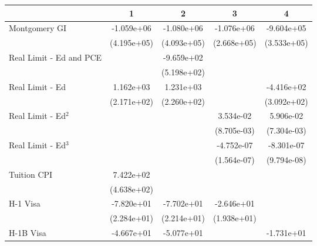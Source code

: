 
\begin{tabular}{l*{4}{c}}
    \toprule
                             &\multicolumn{1}{c}{1}&\multicolumn{1}{c}{2}&\multicolumn{1}{c}{3}&\multicolumn{1}{c}{4}\\
    \midrule
    Montgomery GI            &  -1.059e+06\sym{++}&  -1.080e+06\sym{++}&  -1.076e+06\sym{**}&  -9.604e+05\sym{++}\\
                             & (4.195e+05)        & (4.093e+05)        & (2.668e+05)        & (3.533e+05)        \\
    \addlinespace
    Real Limit - Ed and PCE  &                    &  -9.659e+02\sym{+} &                    &                    \\
                             &                    & (5.198e+02)        &                    &                    \\
    \addlinespace
    Real Limit - Ed          &   1.162e+03\sym{**}&   1.231e+03\sym{**}&                    &  -4.416e+02        \\
                             & (2.171e+02)        & (2.260e+02)        &                    & (3.092e+02)        \\
    \addlinespace
    Real Limit - Ed$^2$        &                    &                    &   3.534e-02\sym{**}&   5.906e-02\sym{**}\\
                             &                    &                    & (8.705e-03)        & (7.304e-03)        \\
    \addlinespace
    Real Limit - Ed$^3$        &                    &                    &  -4.752e-07\sym{*} &  -8.301e-07\sym{**}\\
                             &                    &                    & (1.564e-07)        & (9.794e-08)        \\
    \addlinespace
    Tuition CPI              &   7.422e+02        &                    &                    &                    \\
                             & (4.638e+02)        &                    &                    &                    \\
    \addlinespace
    H-1 Visa                 &  -7.820e+01\sym{*} &  -7.702e+01\sym{*} &  -2.646e+01        &                    \\
                             & (2.284e+01)        & (2.214e+01)        & (1.938e+01)        &                    \\
    \addlinespace
    H-1B Visa                &  -4.667e+01\sym{+} &  -5.077e+01\sym{+} &                    &  -1.731e+01\sym{++}\\

\end{tabular}

